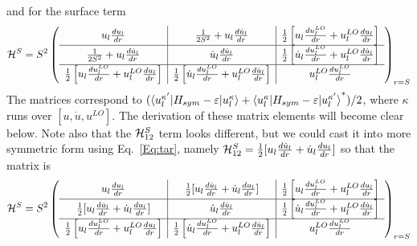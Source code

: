 \documentclass[aps,prb,floatfix,epsfig,singlecolumn,showpacs,preprintnumbers]{revtex4}
\newcommand{\cH}{{\cal H}}
\begin{document}
and for the surface term
\begin{eqnarray}
{\cal H}^S=S^2
\left(\begin{array}{c|c|c}
u_l\frac{d u_l}{dr} & \frac{1}{2 S^2}+ u_l\frac{d\dot{u}_l}{dr} & \frac{1}{2}\left[u_l\frac{du_l^{LO}}{dr}+u^{LO}_l\frac{du_l}{dr}\right]\\
\hline
\frac{1}{2 S^2}+ u_l \frac{d\dot{u}_l}{dr} & \dot{u}_l \frac{d\dot{u}_l}{dr} &\frac{1}{2}\left[\dot{u}_l\frac{du_l^{LO}}{dr}+u^{LO}_l\frac{d\dot{u}_l}{dr}\right]\\
\hline
\frac{1}{2}\left[u_l\frac{du_l^{LO}}{dr}+u^{LO}_l\frac{du_l}{dr}\right]&\frac{1}{2}\left[\dot{u}_l\frac{du_l^{LO}}{dr}+u^{LO}_l\frac{d\dot{u}_l}{dr}\right]& u^{LO}_l\frac{d u^{LO}_l}{dr} 
\end{array}
\right)_{r=S}
\end{eqnarray}
The matrices correspond to
$(\braket{u_l^{\kappa'}|H_{sym}-\varepsilon|u_l^{\kappa}}+\braket{u_l^{\kappa}|H_{sym}-\varepsilon|u_l^{\kappa'}}^*)/2$,
where $\kappa$ runs over $[u,\dot{u},u^{LO}]$. The derivation of these
matrix elements will  become clear below.
Note also that the $\cH^S_{12}$ term looks different, but we could
cast it into more symmetric form using Eq.~\ref{Eq:tar}, namely
$\cH^S_{12}=\frac{1}{2}[u_l\frac{d\dot{u}_l}{dr} +\dot{u}_l\frac{d
  u_l}{dr}] $ so that the matrix is
\begin{eqnarray}
{\cal H}^S=S^2
\left(\begin{array}{c|c|c}
u_l\frac{d u_l}{dr} & \frac{1}{2}[u_l\frac{d\dot{u}_l}{dr} +\dot{u}_l\frac{d u_l}{dr}] & \frac{1}{2}\left[u_l\frac{du_l^{LO}}{dr}+u^{LO}_l\frac{du_l}{dr}\right]\\
\hline
\frac{1}{2}[u_l\frac{d\dot{u}_l}{dr} +\dot{u}_l\frac{d u_l}{dr}] & \dot{u}_l \frac{d\dot{u}_l}{dr} &\frac{1}{2}\left[\dot{u}_l\frac{du_l^{LO}}{dr}+u^{LO}_l\frac{d\dot{u}_l}{dr}\right]\\
\hline
\frac{1}{2}\left[u_l\frac{du_l^{LO}}{dr}+u^{LO}_l\frac{du_l}{dr}\right]&\frac{1}{2}\left[\dot{u}_l\frac{du_l^{LO}}{dr}+u^{LO}_l\frac{d\dot{u}_l}{dr}\right]& u^{LO}_l\frac{d u^{LO}_l}{dr} 
\end{array}
\right)_{r=S}
\end{eqnarray}
\end{document}
